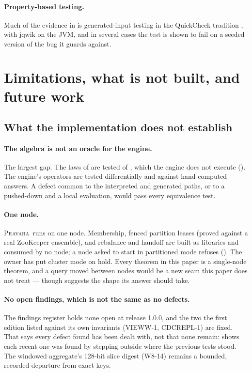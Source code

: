 \documentclass[11pt,a4paper]{article}
\renewcommand{\_}{\oldunderscore\allowbreak}
\newcommand{\Pv}{\textsc{Pravaha}}
\newcommand{\code}[1]{\texttt{\pvbreakable{#1}}}
\begin{document}
\paragraph{Property-based testing.} Much of the evidence in  is generated-input
testing in the QuickCheck tradition \cite{claessen2000}, with jqwik on the JVM, and in several cases the
test is shown to fail on a seeded version of the bug it guards against.

\section{Limitations, what is not built, and future work}\label{sec:limits}

\subsection{What the implementation does not establish}

\paragraph{The algebra is not an oracle for the engine.} The largest gap. The laws of
 are tested of \code{pravaha-algebra}, which the engine does not execute
(). The engine's operators are tested differentially and against hand-computed
answers. A defect common to the interpreted and generated paths, or to a pushed-down and a local
evaluation, would pass every equivalence test.

\paragraph{One node.} \Pv\ runs on one node. Membership, fenced partition leases (proved against a real
ZooKeeper ensemble), and rebalance and handoff are built as libraries and consumed by no node; a node
asked to start in partitioned mode refuses (\code{PRV-9002}). The owner has put cluster mode on hold.
Every theorem in this paper is a single-node theorem, and a query moved between nodes would be a new
seam this paper does not treat --- though  suggests the shape its answer should take.

\paragraph{No open findings, which is not the same as no defects.} The findings register holds none open
at release 1.0.0, and the two the first edition listed against its own invariants (VIEWW-1, CDCREPL-1)
are fixed. That says every defect found has been dealt with, not that none remain: 
shows each recent one was found by stepping outside where the previous tests stood. The windowed
aggregate's 128-bit slice digest (W8-14) remains a bounded, recorded departure from exact keys.
\end{document}
